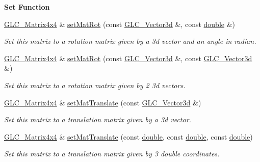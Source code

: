 \begin{Indent}{\bf Set Function}\par
\begin{DoxyCompactItemize}
\item 
\hyperlink{class_g_l_c___matrix4x4}{G\-L\-C\-\_\-\-Matrix4x4} \& \hyperlink{class_g_l_c___matrix4x4_a0c8a96e0b3fe7934fd7355a86935dfd0}{set\-Mat\-Rot} (const \hyperlink{class_g_l_c___vector3d}{G\-L\-C\-\_\-\-Vector3d} \&, const \hyperlink{_super_l_u_support_8h_a8956b2b9f49bf918deed98379d159ca7}{double} \&)
\begin{DoxyCompactList}\small\item\em Set this matrix to a rotation matrix given by a 3d vector and an angle in radian. \end{DoxyCompactList}\item 
\hyperlink{class_g_l_c___matrix4x4}{G\-L\-C\-\_\-\-Matrix4x4} \& \hyperlink{class_g_l_c___matrix4x4_ac93165bb134b75055b86dd2994b4c216}{set\-Mat\-Rot} (const \hyperlink{class_g_l_c___vector3d}{G\-L\-C\-\_\-\-Vector3d} \&, const \hyperlink{class_g_l_c___vector3d}{G\-L\-C\-\_\-\-Vector3d} \&)
\begin{DoxyCompactList}\small\item\em Set this matrix to a rotation matrix given by 2 3d vectors. \end{DoxyCompactList}\item 
\hyperlink{class_g_l_c___matrix4x4}{G\-L\-C\-\_\-\-Matrix4x4} \& \hyperlink{class_g_l_c___matrix4x4_acbb8fa4fcee64a290f18c896d5f0fce1}{set\-Mat\-Translate} (const \hyperlink{class_g_l_c___vector3d}{G\-L\-C\-\_\-\-Vector3d} \&)
\begin{DoxyCompactList}\small\item\em Set this matrix to a translation matrix given by a 3d vector. \end{DoxyCompactList}\item 
\hyperlink{class_g_l_c___matrix4x4}{G\-L\-C\-\_\-\-Matrix4x4} \& \hyperlink{class_g_l_c___matrix4x4_ac7c5de6ed326e102d8a77c37e0864784}{set\-Mat\-Translate} (const \hyperlink{_super_l_u_support_8h_a8956b2b9f49bf918deed98379d159ca7}{double}, const \hyperlink{_super_l_u_support_8h_a8956b2b9f49bf918deed98379d159ca7}{double}, const \hyperlink{_super_l_u_support_8h_a8956b2b9f49bf918deed98379d159ca7}{double})
\begin{DoxyCompactList}\small\item\em Set this matrix to a translation matrix given by 3 double coordinates. \end{DoxyCompactList}\item 

\end{DoxyCompactItemize}
\end{Indent}
